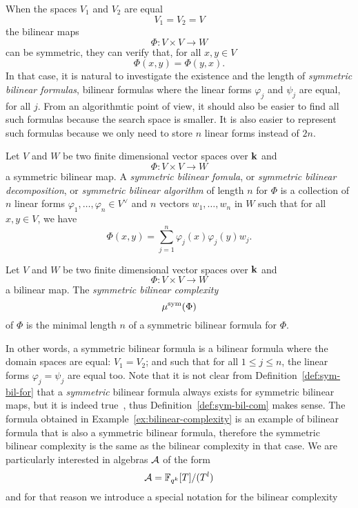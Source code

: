 When the spaces $V_1$ and $V_2$ are equal
\[
  V_1 = V_2 = V
\]
the bilinear maps 
\[
  \Phi:V\times V\to W
\]
can be symmetric, \ie they can verify that, for all $x, y\in V$
\[
  \Phi(x, y) = \Phi(y, x).
\]
In that case, it is natural to investigate the existence and the length of
\emph{symmetric bilinear formulas}, \ie bilinear formulas where the linear forms
$\varphi_j$ and $\psi_j$ are equal, for all $j$. From an algorithmtic point of
view, it should also be easier to find all such formulas because the
search space is smaller. It is also easier to represent such formulas because we
only need to store $n$ linear forms instead of $2n$.
\begin{defi}
  \label{def:sym-bil-for}
  Let $V$ and $W$ be two finite dimensional vector spaces over $\mathbf{k}$ and 
  \[
    \Phi:V\times V\to W
  \]
  a symmetric bilinear map. A \emph{symmetric bilinear fomula}, or
  \emph{symmetric bilinear decomposition}, or
  \emph{symmetric bilinear algorithm} of length $n$ for $\Phi$ is a
  collection of $n$ linear forms $\varphi_1, \dots, \varphi_n\in V^\vee$
  and $n$ vectors $w_1, \dots, w_n$ in $W$ such that for all
  $x, y\in V$, we have
  \[
    \Phi(x, y) = \sum_{j=1}^n \varphi_j(x)\varphi_j(y)w_j.
  \]
\end{defi}
\begin{defi}
  \label{def:sym-bil-com}
  Let $V$ and $W$ be two finite dimensional vector spaces over $\mathbf{k}$ and 
  \[
    \Phi:V\times V\to W
  \]
  a bilinear map. The \emph{symmetric bilinear complexity} 
  \[
    \mu^{\textrm{sym}}(\Phi)
  \]
  of $\Phi$ is the minimal length $n$ of a symmetric bilinear formula for
  $\Phi$.
\end{defi}
In other words, a symmetric bilinear formula is a bilinear formula where the
domain spaces are equal: $V_1=V_2$; and such that for all $1\leq j\leq n$,
the linear forms $\varphi_j=\psi_j$ are equal too. Note that it is not
clear from Definition~\ref{def:sym-bil-for} that a
\emph{symmetric} bilinear formula always
exists for symmetric bilinear maps, but it is indeed
true~\cite[Lemma $1.6$]{Randriam12}, thus
Definition~\ref{def:sym-bil-com} makes sense. The formula obtained in
Example~\ref{ex:bilinear-complexity} is an example of bilinear formula that is
also a symmetric bilinear formula, therefore the symmetric bilinear complexity
is the same as the bilinear complexity in that case. We are particularly
interested in algebras $\mathcal{A}$ of the form
\[
  \mathcal{A} = \mathbb{F}_{q^k}[T]/(T^l)
\]
and for that reason we introduce a special notation for the bilinear complexity
